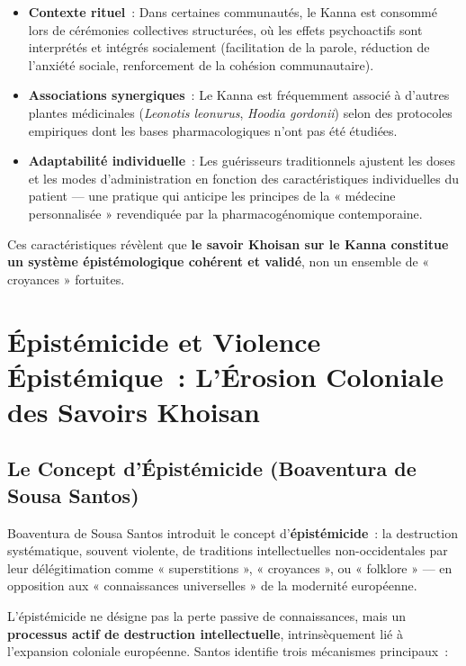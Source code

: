 \documentclass[12pt,a4paper,twoside]{book}
\begin{document}
\begin{itemize}
\item \textbf{Contexte rituel}~: Dans certaines communautés, le Kanna est consommé lors de cérémonies collectives structurées, où les effets psychoactifs sont interprétés et intégrés socialement (facilitation de la parole, réduction de l'anxiété sociale, renforcement de la cohésion communautaire).

\item \textbf{Associations synergiques}~: Le Kanna est fréquemment associé à d'autres plantes médicinales (\textit{Leonotis leonurus}, \textit{Hoodia gordonii}) selon des protocoles empiriques dont les bases pharmacologiques n'ont pas été étudiées.

\item \textbf{Adaptabilité individuelle}~: Les guérisseurs traditionnels ajustent les doses et les modes d'administration en fonction des caractéristiques individuelles du patient --- une pratique qui anticipe les principes de la « médecine personnalisée » revendiquée par la pharmacogénomique contemporaine.
\end{itemize}

Ces caractéristiques révèlent que \textbf{le savoir Khoisan sur le Kanna constitue un système épistémologique cohérent et validé}, non un ensemble de « croyances » fortuites.

\section{Épistémicide et Violence Épistémique~: L'Érosion Coloniale des Savoirs Khoisan}

\subsection{Le Concept d'Épistémicide (Boaventura de Sousa Santos)}

Boaventura de Sousa Santos \parencite{santos2014} introduit le concept d'\textbf{épistémicide}~: la destruction systématique, souvent violente, de traditions intellectuelles non-occidentales par leur délégitimation comme « superstitions », « croyances », ou « folklore » --- en opposition aux « connaissances universelles » de la modernité européenne.

L'épistémicide ne désigne pas la perte passive de connaissances, mais un \textbf{processus actif de destruction intellectuelle}, intrinsèquement lié à l'expansion coloniale européenne. Santos identifie trois mécanismes principaux~:
\end{document}
